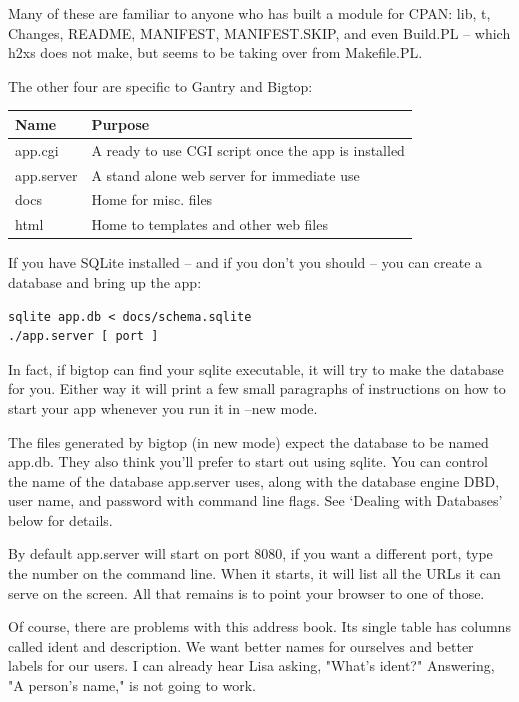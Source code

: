Many of these are familiar to anyone who has built a module for CPAN:
lib, t, Changes, README, MANIFEST, MANIFEST.SKIP, and even Build.PL -- which
h2xs does not make, but seems to be taking over from Makefile.PL.

The other four are specific to Gantry and Bigtop:

\begin{tabular}{l|l}
Name & Purpose \\
\hline
app.cgi    & A ready to use CGI script once the app is installed \\
app.server & A stand alone web server for immediate use          \\
docs       & Home for misc. files                                \\
html       & Home to templates and other web files               \\
\end{tabular}

If you have SQLite installed -- and if you don't you should -- you can
create a database and bring up the app:

\begin{verbatim}
sqlite app.db < docs/schema.sqlite
./app.server [ port ]
\end{verbatim}

In fact, if bigtop can find your sqlite executable, it will try to make
the database for you.  Either way it will print a few small paragraphs
of instructions on how to start your app whenever you run it in --new mode.

The files generated by bigtop (in new mode) expect the database to be named
app.db.  They also think you'll prefer to start out using sqlite.
You can control the name of the database app.server uses, along with the
database engine DBD, user name, and password with command line flags.
See `Dealing with Databases' below for details.

By default app.server will start on port 8080, if you want a different
port, type the number on the command line.  When it starts, it will list
all the URLs it can serve on the screen.  All that remains is to
point your browser to one of those.

Of course, there are problems with this address book.  Its single table
has columns called ident and description.  We want better names for ourselves
and better labels for our users.  I can already hear Lisa asking, "What's
ident?"  Answering, "A person's name," is not going to work.


